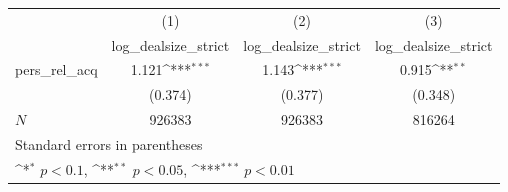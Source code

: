 {
\def\sym#1{\ifmmode^{#1}\else\(^{#1}\)\fi}
\begin{tabular}{l*{3}{c}}
\hline\hline
            &\multicolumn{1}{c}{(1)}&\multicolumn{1}{c}{(2)}&\multicolumn{1}{c}{(3)}\\
            &\multicolumn{1}{c}{log\_dealsize\_strict}&\multicolumn{1}{c}{log\_dealsize\_strict}&\multicolumn{1}{c}{log\_dealsize\_strict}\\
\hline
pers\_rel\_acq&       1.121\sym{***}&       1.143\sym{***}&       0.915\sym{**} \\
            &     (0.374)         &     (0.377)         &     (0.348)         \\
\hline
\(N\)       &      926383         &      926383         &      816264         \\
\hline\hline
\multicolumn{4}{l}{\footnotesize Standard errors in parentheses}\\
\multicolumn{4}{l}{\footnotesize \sym{*} \(p<0.1\), \sym{**} \(p<0.05\), \sym{***} \(p<0.01\)}\\
\end{tabular}
}
